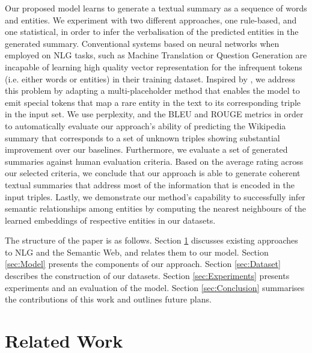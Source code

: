 \documentclass[preprint,5p]{elsarticle}
\begin{document}
Our proposed model learns to generate a textual summary as a sequence of words and entities. We experiment with two different approaches, one rule-based, and one statistical, in order to infer the verbalisation of the predicted entities in the generated summary. Conventional systems based on neural networks when employed on NLG tasks, such as Machine Translation \cite{Sutskever2014} or Question Generation \cite{Serban2016} are incapable of learning high quality vector representation for the infrequent tokens (i.e. either words or entities) in their training dataset. Inspired by \cite{Luong2015a,Serban2016}, we address this problem by adapting a multi-placeholder method that enables the model to emit special tokens that map a rare entity in the text to its corresponding triple in the input set. We use perplexity, and the BLEU and ROUGE metrics in order to automatically evaluate our approach's ability of predicting the Wikipedia summary that corresponds to a set of unknown triples showing substantial improvement over our baselines. Furthermore, we evaluate a set of generated summaries against human evaluation criteria. Based on the average rating across our selected criteria, we conclude that our approach is able to generate coherent textual summaries that address most of the information that is encoded in the input triples. Lastly, we demonstrate our method's capability to successfully infer semantic relationships among entities by computing the nearest neighbours of the learned embeddings of respective entities in our datasets.

The structure of the paper is as follows. Section \ref{sec:Related} discusses existing approaches to NLG and the Semantic Web, and relates them to our model. Section \ref{sec:Model} presents the components of our approach. Section \ref{sec:Dataset} describes the construction of our datasets. Section \ref{sec:Experiments} presents experiments and an evaluation of the model. Section \ref{sec:Conclusion} summarises the contributions of this work and outlines future plans.



\section{Related Work}
\label{sec:Related}
\end{document}
